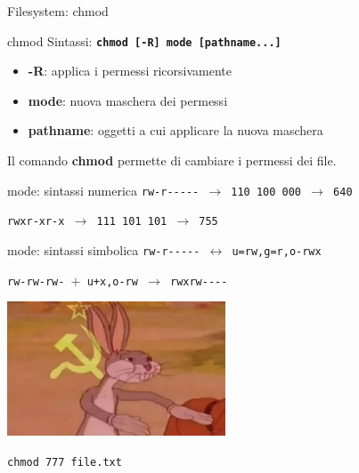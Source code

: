 \documentclass{beamer}
\begin{document}
    \begin{frame}{Filesystem: chmod}
        \begin{block}{chmod}
            Sintassi: \texttt{\textbf{chmod [-R] mode [pathname...]}}

            \begin{itemize}
                \item \textbf{-R}: applica i permessi ricorsivamente
                \item \textbf{mode}: nuova maschera dei permessi
                \item \textbf{pathname}: oggetti a cui applicare la nuova maschera
            \end{itemize}

            Il comando \textbf{chmod} permette di cambiare i permessi dei file.
        \end{block}

        \begin{alertblock}{mode: sintassi numerica}
            \texttt{rw-r-{}-{}-{}-{}- $\rightarrow$ 110 100 000 $\rightarrow$ 640}

            \texttt{rwxr-xr-x $\rightarrow$ 111 101 101 $\rightarrow$ 755}
        \end{alertblock}

        \begin{alertblock}{mode: sintassi simbolica}
            \texttt{rw-r-{}-{}-{}-{}- $\leftrightarrow$ u=rw,g=r,o-rwx}
        
            \texttt{rw-rw-rw- $+$ u+x,o-rw $\rightarrow$ rwxrw-{}-{}-{}-}
        \end{alertblock}
    \end{frame}

    \begin{frame}{}
        \centering
        \includegraphics[height=4cm, keepaspectratio]{images/bugs-bunny-communist.png}
        
        \vspace{0.5cm}
        
        \Large \texttt{chmod 777 file.txt}
    \end{frame}
\end{document}
